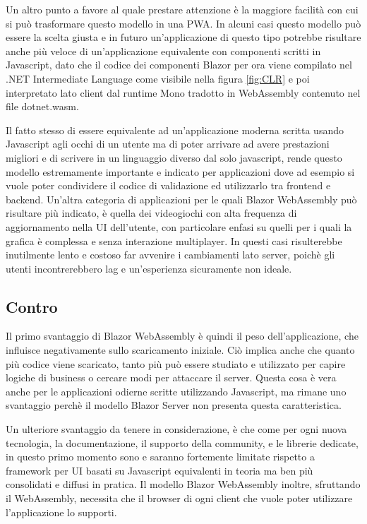Un altro punto a favore al quale prestare attenzione \`e la maggiore facilit\`a con cui si pu\`o trasformare questo modello in una PWA.
In alcuni casi questo modello pu\`o essere la scelta giusta e in futuro un'applicazione di questo tipo potrebbe risultare anche pi\`u veloce di un'applicazione equivalente con componenti scritti in Javascript, dato che il codice dei componenti Blazor per ora viene compilato nel .NET Intermediate Language come visibile nella figura \ref{fig:CLR} e poi interpretato lato client dal runtime Mono tradotto in WebAssembly contenuto nel file dotnet.wasm.

Il fatto stesso di essere equivalente ad un'applicazione moderna scritta usando Javascript agli occhi di un utente ma di poter arrivare ad avere prestazioni migliori e di scrivere in un linguaggio diverso dal solo javascript, rende questo modello estremamente importante e indicato per applicazioni dove ad esempio si vuole poter condividere il codice di validazione ed utilizzarlo tra frontend e backend.
Un'altra categoria di applicazioni per le quali Blazor WebAssembly pu\`o risultare pi\`u indicato, \`e quella dei videogiochi con alta frequenza di aggiornamento nella UI dell'utente, con particolare enfasi su quelli per i quali la grafica \`e complessa e senza interazione multiplayer.
In questi casi risulterebbe inutilmente lento e costoso far avvenire i cambiamenti lato server, poich\`e gli utenti incontrerebbero lag e un'esperienza sicuramente non ideale.
 
\subsection{Contro}\label{sez:controBWA}
Il primo svantaggio di Blazor WebAssembly \`e quindi il peso dell'applicazione, che influisce negativamente sullo scaricamento iniziale.
Ci\`o implica anche che quanto pi\`u codice viene scaricato, tanto pi\`u pu\`o essere studiato e utilizzato per capire logiche di business o cercare modi per attaccare il server.
Questa cosa \`e vera anche per le applicazioni odierne scritte utilizzando Javascript, ma rimane uno svantaggio perch\`e il modello Blazor Server non presenta questa caratteristica.

Un ulteriore svantaggio da tenere in considerazione, \`e che come per ogni nuova tecnologia, la documentazione, il supporto della community, e le librerie dedicate, in questo primo momento sono e saranno fortemente limitate rispetto a framework per UI basati su Javascript equivalenti in teoria ma ben pi\`u consolidati e diffusi in pratica.
Il modello Blazor WebAssembly inoltre, sfruttando il WebAssembly, necessita che il browser di ogni client che vuole poter utilizzare l'applicazione lo supporti.

